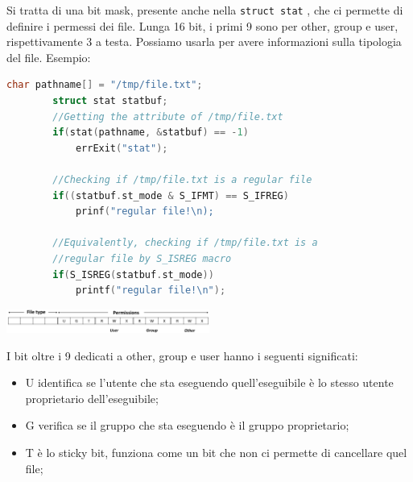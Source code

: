 \documentclass[a4paper, 12pt]{book}
\begin{document}
    Si tratta di una bit mask, presente anche nella \verb|struct stat|
    , che ci permette di definire i permessi dei file. 
    Lunga 16 bit, i primi 9 sono per other, group e user, 
    rispettivamente 3 a testa. Possiamo usarla per avere 
    informazioni sulla tipologia del file. Esempio:
    \begin{lstlisting}[language=C]
        char pathname[] = "/tmp/file.txt";
        struct stat statbuf;
        //Getting the attribute of /tmp/file.txt
        if(stat(pathname, &statbuf) == -1)
            errExit("stat");

        //Checking if /tmp/file.txt is a regular file
        if((statbuf.st_mode & S_IFMT) == S_IFREG)
            prinf("regular file!\n);

        //Equivalently, checking if /tmp/file.txt is a 
        //regular file by S_ISREG macro
        if(S_ISREG(statbuf.st_mode))
            printf("regular file!\n");
    \end{lstlisting}
    \begin{center}
        \includegraphics[width=0.5\textwidth]{st_mode.png}
    \end{center}
    I bit oltre i 9 dedicati a other, group e user hanno 
    i seguenti significati:
    \begin{itemize}
        \item U identifica se l'utente che sta eseguendo quell'eseguibile è lo stesso utente proprietario dell'eseguibile;
        \item G verifica se il gruppo che sta eseguendo è il gruppo proprietario;
        \item T è lo sticky bit, funziona come un bit che non ci permette di cancellare quel file;
    \end{itemize}
    
    
\end{document}
